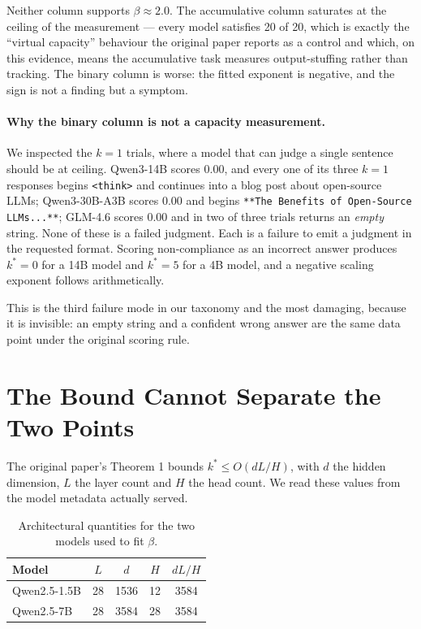 \documentclass[preprint,12pt]{elsarticle}
\theoremstyle{plain}
\begin{document}
Neither column supports $\beta \approx 2.0$. The accumulative column saturates at the ceiling of the measurement --- every model satisfies 20 of 20, which is exactly the ``virtual capacity'' behaviour the original paper reports as a control and which, on this evidence, means the accumulative task measures output-stuffing rather than tracking. The binary column is worse: the fitted exponent is negative, and the sign is not a finding but a symptom.

\paragraph{Why the binary column is not a capacity measurement.} We inspected the $k=1$ trials, where a model that can judge a single sentence should be at ceiling. Qwen3-14B scores 0.00, and every one of its three $k=1$ responses begins \texttt{<think>} and continues into a blog post about open-source LLMs; Qwen3-30B-A3B scores 0.00 and begins \texttt{**The Benefits of Open-Source LLMs...**}; GLM-4.6 scores 0.00 and in two of three trials returns an \emph{empty} string. None of these is a failed judgment. Each is a failure to emit a judgment in the requested format. Scoring non-compliance as an incorrect answer produces $k^* = 0$ for a 14B model and $k^* = 5$ for a 4B model, and a negative scaling exponent follows arithmetically.

This is the third failure mode in our taxonomy and the most damaging, because it is invisible: an empty string and a confident wrong answer are the same data point under the original scoring rule.

\section{The Bound Cannot Separate the Two Points}
\label{sec:bound}

The original paper's Theorem 1 bounds $k^* \leq O(dL/H)$, with $d$ the hidden dimension, $L$ the layer count and $H$ the head count. We read these values from the model metadata actually served.

\begin{table}[H]
\centering
\small
\caption{Architectural quantities for the two models used to fit $\beta$.}
\label{tab:arch}
\begin{tabular}{lcccc}
\toprule
Model & $L$ & $d$ & $H$ & $dL/H$ \\
\midrule
Qwen2.5-1.5B & 28 & 1536 & 12 & 3584 \\
Qwen2.5-7B   & 28 & 3584 & 28 & 3584 \\
\bottomrule
\end{tabular}
\end{table}
\end{document}
